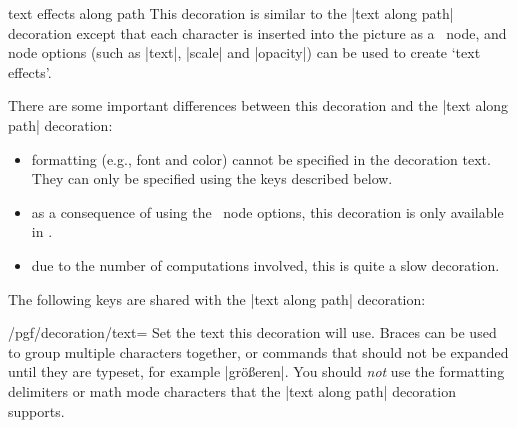 \begin{decoration}{text effects along path}
    This decoration is similar to the |text along path| decoration except that
    each character is inserted into the picture as a \tikzname\ node, and node
    options (such as |text|, |scale| and |opacity|) can be used to create `text
    effects'.
\begin{codeexample}[preamble={\usetikzlibrary{decorations.text,math}}]
\bfseries\large
{}
\end{codeexample}

    There are some important differences between this decoration and the
    |text along path| decoration:
    \begin{itemize}
        \item formatting (e.g., font and color) cannot be specified in the
            decoration text. They can only be specified using the keys
            described below.
        \item as a consequence of using the \tikzname\ node options, this
            decoration is only available in \tikzname.
        \item due to the number of computations involved, this is quite a slow
            decoration.
    \end{itemize}

    The following keys are shared with the |text along path| decoration:

    \begin{key}{/pgf/decoration/text=}
        Set the text this decoration will use. Braces can be used to group
        multiple characters together, or commands that should not be expanded
        until they are typeset, for example |gr{\"o}{\ss}eren|. You should
        \emph{not} use the formatting delimiters or math mode characters that
        the |text along path| decoration  supports.
    \end{key}


\end{decoration}
